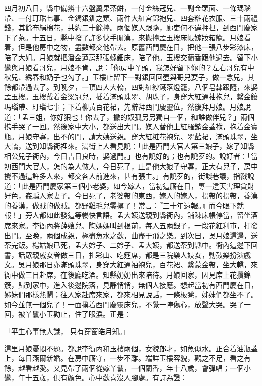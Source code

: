 四月初八日，縣中備辨十六盤羹果茶餅，一付金絲冠兒、一副金頭面、一條瑪瑙帶、一付玎璫七事、金鐲銀釧之類、兩件大紅宮錦袍兒、四套粧花衣服、三十兩禮錢，其餘布絹棉花，共約二十餘擡。兩個媒人跟隨，廊吏何不違押担，到西門慶家下了茶。十五日，縣中撥了許多快手閒漢，來搬擡孟玉樓床帳嫁妝箱籠。月娘看着，但是他房中之物，盡數都交他帶去。原舊西門慶在日，把他一張八步彩漆床，陪了大姐。月娘就把潘金蓮房那張螺鈿床，陪了他。玉樓交蘭香跟他過去。留下小鸞與月娘看哥兒，月娘不肯，說：「你房中丫頭，我怎好留下你的？左右哥兒有中秋兒、綉春和奶子也勾了。」玉樓止留下一對銀回回壺與哥兒耍子，做一念兒，其餘都帶過去了。到晚夕，一頂四人大轎，四對紅紗鐵落燈籠，八個皂隸跟隨，來娶孟玉樓。玉樓戴着金梁冠兒，插着滿頭珠翠、胡珠子，身穿大紅通袖袍兒，繫金鑲瑪瑙帶、玎璫七事；下着柳黃百花裙，先辭拜西門慶靈位，然後拜月娘。月娘說道：「孟三姐，你好狠也！你去了，撇的奴孤另另獨自一個，和誰做伴兒？」兩個携手哭了一回。然後家中大小，都送出大門。媒人替他上紅羅銷金蓋袱，抱着金寶瓶。月娘守寡，出不的門，請大姨送親。穿大紅粧花袍兒、翠藍裙，滿頭珠翠，坐大轎，送到知縣衙裡來。滿街上人看見說：「此是西門大官人第三娘子，嫁了知縣相公兒子衙內，今日吉日良時，娶過門。」也有說好的；也有說歹的。說好者：「當初西門大官人，怎的為人做人，今日死了，止是他大娘子守寡，正大有兒子，房中攪不過這許多人來，都交各人前進來，甚有張主。」有說歹的，街談巷議，指戮說道：「此是西門慶家第三個小老婆，如今嫁人，當初這廝在日，專一違天害理貪財好色，姦騙人家妻子。今日死了，老婆帶的東西，嫁人的嫁人，拐帶的拐帶，養漢的養漢，做賊的做賊。都野雞毛兒零撏了！常言：『三十年遠報。』而今眼下就報！」旁人都如此發這等暢快言語。孟大姨送親到縣衙內，舖陳床帳停當，留坐酒席來家。李衙內將薛嫂兒、陶媽媽叫到根前，每人五兩銀子，一段花紅利市，打發出門。至晚，兩個成親，極盡魚水之歡，曲盡于飛之樂。到次日，吳月娘這邊，送茶完飯。楊姑娘已死，孟大妗子、二妗子、孟大姨，都送茶到縣中。衙內這邊下回書，話眾親戚女眷做三日，扎彩山、吃筵席，都是三院樂人妓女，動鼓樂扮演戲文。吳月娘那日亦滿頭珠翠，身穿大紅通袖袍兒，百花裙、繫蒙金帶，坐大轎，來衙中做三日赴席，在後廳吃酒。知縣奶奶出來陪待。月娘回家，因見席上花攢錦簇，歸到家中，進入後邊院落，見靜悄悄，無個人接應。想起當初有西門慶在日，姊妹們那樣熱鬧；往人家赴席來家，都來相見說話，一條板凳，姊妹們都坐不了。如今並無一個兒了！一面撲着西門慶靈床兒，不覺一陣傷心，放聲大哭。哭了一回，被丫鬟小玉勸止，住了眼淚。正是：

「平生心事無人識，  只有穿窗皓月知。」

這里月娘憂悶不題。都說李衙內和玉樓兩個，女貌郎才，如魚似水。正合着油瓶蓋上，每日燕爾新婚。在房中廝守，一步不離。端詳玉樓容貌，觀之不足，看之有餘，越看越愛。又見帶了兩個從嫁丫鬟，一個蘭香，年十八歲，會彈唱；一個小鸞，年十五歲，俱有顏色。心中歡喜沒人腳處。有詩為證：

